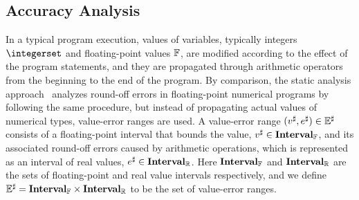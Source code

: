 \subsection{Accuracy Analysis}
\label{sub:accuracy_analysis}

In a typical program execution, values of variables, typically integers
$\integerset$ and floating-point values $\mathbb{F}$, are modified according
to the effect of the program statements, and they are propagated through
arithmetic operators from the beginning to the end of the program.  By
comparison, the static analysis approach~\cite{soap,martel07} analyzes
round-off errors in floating-point numerical programs by following the same
procedure, but instead of propagating actual values of numerical types,
value-error ranges are used.  A value-error range $(v^\sharp, e^\sharp) \in
\mathbb{E}^\sharp$ consists of a floating-point interval that bounds the value,
$v^\sharp \in \mathbf{Interval}_\mathbb{F}$, and its associated round-off errors
caused by arithmetic operations, which is represented as an interval of real
values, $e^\sharp \in \mathbf{Interval}_\mathbb{R}$.  Here $\mathbf{Interval}_\mathbb{F}$
and $\mathbf{Interval}_\mathbb{R}$ are the sets of floating-point and real value
intervals respectively, and we define $\mathbb{E}^\sharp = \mathbf{Interval}_\mathbb{F}
\times \mathbf{Interval}_\mathbb{R}$ to be the set of value-error ranges.

